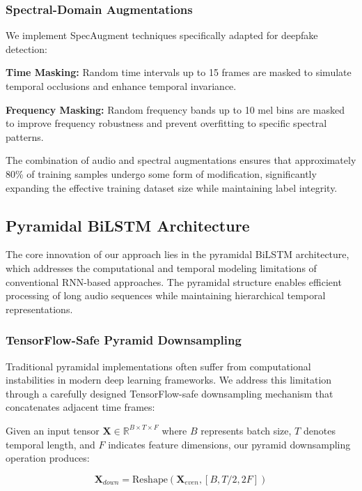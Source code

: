 \documentclass[conference]{IEEEtran}
\begin{document}
\subsubsection{Spectral-Domain Augmentations}
We implement SpecAugment \cite{park2019specaugment} techniques specifically adapted for deepfake detection:

\textbf{Time Masking:} Random time intervals up to 15 frames are masked to simulate temporal occlusions and enhance temporal invariance.

\textbf{Frequency Masking:} Random frequency bands up to 10 mel bins are masked to improve frequency robustness and prevent overfitting to specific spectral patterns.

The combination of audio and spectral augmentations ensures that approximately 80\% of training samples undergo some form of modification, significantly expanding the effective training dataset size while maintaining label integrity.

\subsection{Pyramidal BiLSTM Architecture}

The core innovation of our approach lies in the pyramidal BiLSTM architecture, which addresses the computational and temporal modeling limitations of conventional RNN-based approaches. The pyramidal structure enables efficient processing of long audio sequences while maintaining hierarchical temporal representations.

\subsubsection{TensorFlow-Safe Pyramid Downsampling}

Traditional pyramidal implementations often suffer from computational instabilities in modern deep learning frameworks. We address this limitation through a carefully designed TensorFlow-safe downsampling mechanism that concatenates adjacent time frames:

Given an input tensor $\mathbf{X} \in \mathbb{R}^{B \times T \times F}$ where $B$ represents batch size, $T$ denotes temporal length, and $F$ indicates feature dimensions, our pyramid downsampling operation produces:

\begin{equation}
\mathbf{X}_{down} = \text{Reshape}(\mathbf{X}_{even}, [B, T/2, 2F])
\end{equation}
\end{document}
